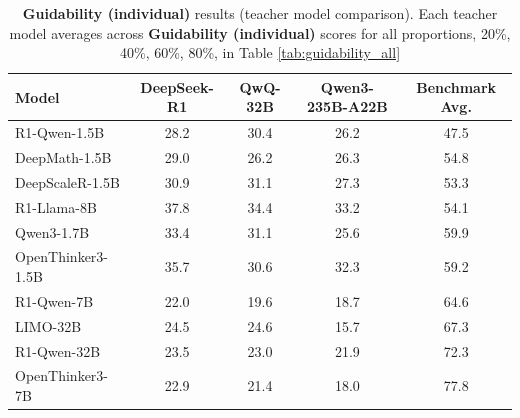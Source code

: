 \documentclass{article} %
\begin{document}
\begin{table}[ht]
  \centering
  \small
  \begin{tabular}{lccc|c}
    \toprule
    \textbf{Model} & \textbf{DeepSeek-R1} & \textbf{QwQ-32B} & \textbf{Qwen3-235B-A22B} & \textbf{Benchmark Avg.} \\
    \midrule
    R1-Qwen-1.5B    & 28.2 & 30.4 & 26.2 & 47.5 \\
    DeepMath-1.5B           & 29.0 & 26.2 & 26.3 & 54.8 \\
    DeepScaleR-1.5B         & 30.9 & 31.1 & 27.3 & 53.3 \\
    R1-Llama-8B     & 37.8 & 34.4 & 33.2 & 54.1 \\
    Qwen3-1.7B              & 33.4 & 31.1 & 25.6 & 59.9 \\
    OpenThinker3-1.5B       & 35.7 & 30.6 & 32.3 & 59.2 \\
    R1-Qwen-7B      & 22.0 & 19.6 & 18.7 & 64.6 \\
    LIMO-32B                & 24.5 & 24.6 & 15.7 & 67.3 \\
    R1-Qwen-32B     & 23.5 & 23.0 & 21.9 & 72.3 \\
    OpenThinker3-7B         & 22.9 & 21.4 & 18.0 & 77.8 \\
    \bottomrule
  \end{tabular}
  \caption{\textbf{Guidability (individual)} results (teacher model comparison). Each teacher model averages across \textbf{Guidability (individual)} scores for all proportions, 20\%, 40\%, 60\%, 80\%, in Table \ref{tab:guidability_all}}
  \label{tab:guidability_teacher_comparison}
\end{table}
\end{document}
